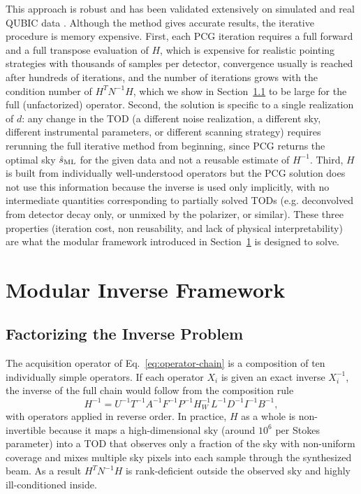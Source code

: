 \documentclass[a4paper,11pt]{article}
\begin{document}
This approach is robust and has been validated extensively on
simulated and real QUBIC data \cite{mousset2022qubic2,
torchinsky2022qubic3, regnier2024freqmaps}. Although the method gives accurate results, the iterative procedure is memory expensive. First, each PCG
iteration requires a full forward and a full transpose evaluation of
$H$, which is expensive for realistic pointing strategies with thousands of samples per detector, convergence usually is reached after hundreds of iterations, and the number of iterations grows with the condition number of $H^TN^{-1}H$, which we
show in Section~\ref{subsec:factorizing} to be large for the full (unfactorized) operator. Second, the solution is specific to a single realization of $d$: any change in the TOD (a different noise realization, a different sky, different instrumental parameters, or different scanning strategy) requires rerunning the full iterative method from beginning, since PCG
returns the optimal sky $\hat{s}_{\rm ML}$ for the given data and not a reusable estimate of $H^{-1}$. Third, $H$ is built from individually well-understood operators but the PCG solution does not use this information because the inverse is used only implicitly, with no intermediate quantities corresponding to partially solved TODs (e.g. deconvolved from detector decay only, or unmixed by the polarizer, or similar). These three properties (iteration cost, non reusability, and lack of physical interpretability) are what the modular framework introduced in Section~\ref{sec:modular} is designed to solve.


\section{Modular Inverse Framework}
\label{sec:modular}

\subsection{Factorizing the Inverse Problem}
\label{subsec:factorizing}

The acquisition operator of Eq.~\ref{eq:operator-chain} is a
composition of ten individually simple operators. If each
operator $X_i$ is given an exact inverse $X_i^{-1}$, the inverse of
the full chain would follow from the composition rule
\begin{equation}
    H^{-1} = U^{-1} T^{-1} A^{-1} F^{-1} P^{-1} H_W^{-1} L^{-1} D^{-1} I^{-1} B^{-1},
    \label{eq:inverse-chain}
\end{equation}
with operators applied in reverse order. In practice, $H$ as a whole is
non-invertible because it maps a high-dimensional sky (around $10^6$ per Stokes parameter) into a TOD that observes only a fraction of the sky with non-uniform coverage and mixes multiple sky pixels into each
sample through the synthesized beam. As a result
$H^TN^{-1}H$ is rank-deficient outside the observed sky and
highly ill-conditioned inside.
\end{document}
